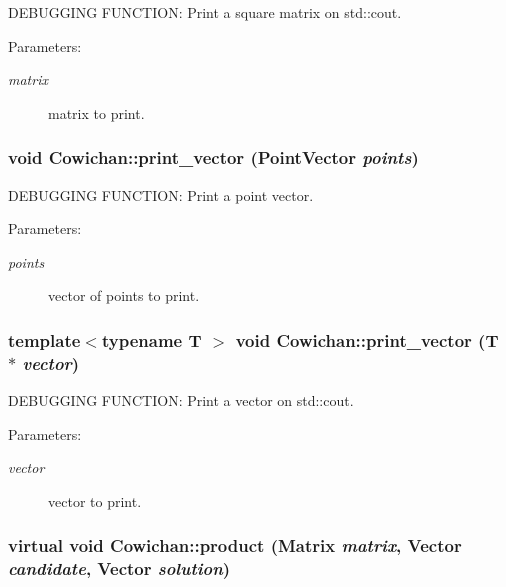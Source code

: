 DEBUGGING FUNCTION: Print a square matrix on std::cout. \begin{Desc}
\item[Parameters:]
\begin{description}
\item[{\em matrix}]matrix to print. \end{description}
\end{Desc}
\hypertarget{class_cowichan_3b974ae1693ac661fb079b28981ca885}{
\subsubsection[{print\_\-vector}]{\setlength{\rightskip}{0pt plus 5cm}void Cowichan::print\_\-vector ({\bf PointVector} {\em points})}}
\label{class_cowichan_3b974ae1693ac661fb079b28981ca885}


DEBUGGING FUNCTION: Print a point vector. \begin{Desc}
\item[Parameters:]
\begin{description}
\item[{\em points}]vector of points to print. \end{description}
\end{Desc}
\hypertarget{class_cowichan_90f1155f5c35308796b142b15d681a4b}{
\subsubsection[{print\_\-vector}]{\setlength{\rightskip}{0pt plus 5cm}template$<$typename T $>$ void Cowichan::print\_\-vector (T $\ast$ {\em vector})}}
\label{class_cowichan_90f1155f5c35308796b142b15d681a4b}


DEBUGGING FUNCTION: Print a vector on std::cout. \begin{Desc}
\item[Parameters:]
\begin{description}
\item[{\em vector}]vector to print. \end{description}
\end{Desc}
\hypertarget{class_cowichan_3d7d4b581a1d6f0392dc452830fb3b03}{
\subsubsection[{product}]{\setlength{\rightskip}{0pt plus 5cm}virtual void Cowichan::product ({\bf Matrix} {\em matrix}, \/  {\bf Vector} {\em candidate}, \/  {\bf Vector} {\em solution})}}
\label{class_cowichan_3d7d4b581a1d6f0392dc452830fb3b03}


